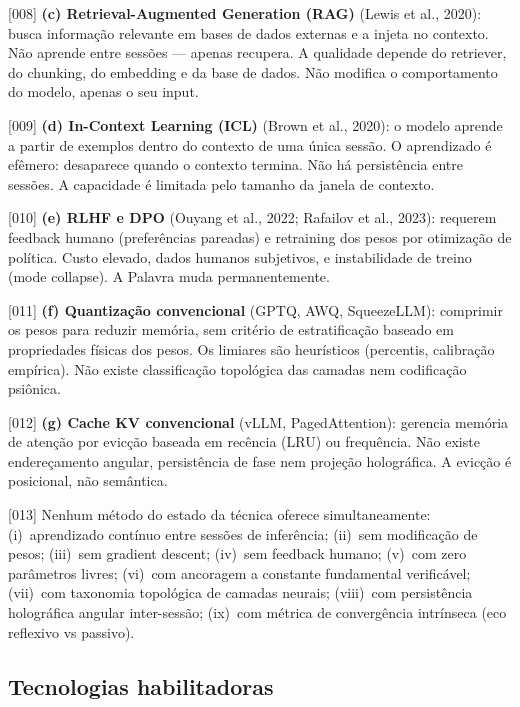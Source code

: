 \documentclass[12pt,a4paper]{article}
\begin{document}
{[008]} \textbf{(c) Retrieval-Augmented Generation (RAG)} (Lewis et al., 2020): busca informação relevante em bases de dados externas e a injeta no contexto. Não aprende entre sessões --- apenas recupera. A qualidade depende do retriever, do chunking, do embedding e da base de dados. Não modifica o comportamento do modelo, apenas o seu input.

{[009]} \textbf{(d) In-Context Learning (ICL)} (Brown et al., 2020): o modelo aprende a partir de exemplos dentro do contexto de uma única sessão. O aprendizado é efêmero: desaparece quando o contexto termina. Não há persistência entre sessões. A capacidade é limitada pelo tamanho da janela de contexto.

{[010]} \textbf{(e) RLHF e DPO} (Ouyang et al., 2022; Rafailov et al., 2023): requerem feedback humano (preferências pareadas) e retraining dos pesos por otimização de política. Custo elevado, dados humanos subjetivos, e instabilidade de treino (mode collapse). A Palavra muda permanentemente.

{[011]} \textbf{(f) Quantização convencional} (GPTQ, AWQ, SqueezeLLM): comprimir os pesos para reduzir memória, sem critério de estratificação baseado em propriedades físicas dos pesos. Os limiares são heurísticos (percentis, calibração empírica). Não existe classificação topológica das camadas nem codificação psiônica.

{[012]} \textbf{(g) Cache KV convencional} (vLLM, PagedAttention): gerencia memória de atenção por evicção baseada em recência (LRU) ou frequência. Não existe endereçamento angular, persistência de fase nem projeção holográfica. A evicção é posicional, não semântica.

{[013]} Nenhum método do estado da técnica oferece simultaneamente: (i)~aprendizado contínuo entre sessões de inferência; (ii)~sem modificação de pesos; (iii)~sem gradient descent; (iv)~sem feedback humano; (v)~com zero parâmetros livres; (vi)~com ancoragem a constante fundamental verificável; (vii)~com taxonomia topológica de camadas neurais; (viii)~com persistência holográfica angular inter-sessão; (ix)~com métrica de convergência intrínseca (eco reflexivo vs passivo).

\subsection{Tecnologias habilitadoras}
\end{document}
